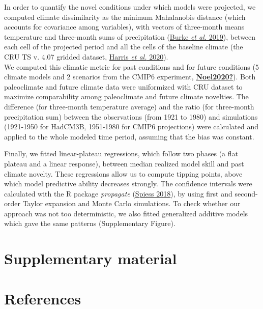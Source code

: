 \documentclass[11pt,]{article}
\begin{document}
In order to quantify the novel conditions under which models were
projected, we computed climate dissimilarity as the minimum Mahalanobis
distance (which accounts for covariance among variables), with vectors
of three-month means temperature and three-month sums of precipitation
(\protect\hyperlink{ref-Burke2019}{Burke \emph{et al.} 2019}), between
each cell of the projected period and all the cells of the baseline
climate (the CRU TS v. 4.07 gridded dataset,
\protect\hyperlink{ref-Harris2020}{Harris \emph{et al.} 2020}).\\
We computed this climatic metric for past conditions and for future
conditions (5 climate models and 2 scenarios from the CMIP6 experiment,
\protect\hyperlink{ref-Noel2020}{\textbf{Noel2020?}}). Both paleoclimate
and future climate data were uniformized with CRU dataset to maximize
comparability among paleoclimate and future climate novelties. The
difference (for three-month temperature average) and the ratio (for
three-month precipitation sum) between the observations (from 1921 to
1980) and simulations (1921-1950 for HadCM3B, 1951-1980 for CMIP6
projections) were calculated and applied to the whole modeled time
period, assuming that the bias was constant.

Finally, we fitted linear-plateau regressions, which follow two phases
(a flat plateau and a linear response), between median realized model
skill and past climate novelty. These regressions allow us to compute
tipping points, above which model predictive ability decreases strongly.
The confidence intervals were calculated with the R package
\emph{propagate} (\protect\hyperlink{ref-Spiess2018}{Spiess 2018}), by
using first and second-order Taylor expansion and Monte Carlo
simulations. To check whether our approach was not too deterministic, we
also fitted generalized additive models which gave the same patterns
(Supplementary Figure).

\hypertarget{supplementary-material}{%
\section{Supplementary material}\label{supplementary-material}}

\hypertarget{references}{%
\section{References}\label{references}}

\setlength{\parindent}{-0.2in}
\setlength{\leftskip}{0.2in}
\setlength{\parskip}{8pt}
\vspace*{-0.2in}
\end{document}
